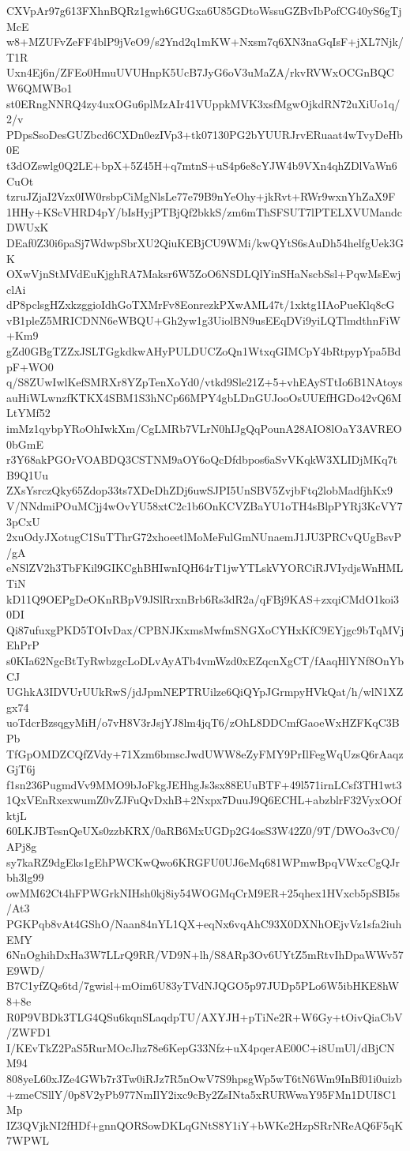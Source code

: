 CXVpAr97g613FXhnBQRz1gwh6GUGxa6U85GDtoWssuGZBvIbPofCG40yS6gTjMcE
w8+MZUFvZeFF4blP9jVeO9/s2Ynd2q1mKW+Nxsm7q6XN3naGqIsF+jXL7Njk/T1R
Uxn4Ej6n/ZFEo0HmuUVUHnpK5UcB7JyG6oV3uMaZA/rkvRVWxOCGnBQCW6QMWBo1
st0ERngNNRQ4zy4uxOGu6plMzAIr41VUppkMVK3xsfMgwOjkdRN72uXiUo1q/2/v
PDpsSsoDesGUZbcd6CXDn0ezIVp3+tk07130PG2bYUURJrvERuaat4wTvyDeHb0E
t3dOZswlg0Q2LE+bpX+5Z45H+q7mtnS+uS4p6e8cYJW4b9VXn4qhZDlVaWn6CuOt
tzruJZjaI2Vzx0IW0rsbpCiMgNlsLe77e79B9nYeOhy+jkRvt+RWr9wxnYhZaX9F
1HHy+KScVHRD4pY/bIsHyjPTBjQf2bkkS/zm6mThSFSUT7lPTELXVUMandcDWUxK
DEaf0Z30i6paSj7WdwpSbrXU2QiuKEBjCU9WMi/kwQYtS6sAuDh54helfgUek3GK
OXwVjnStMVdEuKjghRA7Maksr6W5ZoO6NSDLQlYinSHaNscbSsl+PqwMsEwjclAi
dP8pclsgHZxkzggioIdhGoTXMrFv8EonrezkPXwAML47t/1xktg1IAoPueKlq8cG
vB1pleZ5MRICDNN6eWBQU+Gh2yw1g3UiolBN9usEEqDVi9yiLQTlmdthnFiW+Km9
gZd0GBgTZZxJSLTGgkdkwAHyPULDUCZoQn1WtxqGIMCpY4bRtpypYpa5BdpF+WO0
q/S8ZUwIwlKefSMRXr8YZpTenXoYd0/vtkd9Sle21Z+5+vhEAySTtIo6B1NAtoys
auHiWLwnzfKTKX4SBM1S3hNCp66MPY4gbLDnGUJooOsUUEfHGDo42vQ6MLtYMf52
imMz1qybpYRoOhIwkXm/CgLMRb7VLrN0hIJgQqPounA28AIO8lOaY3AVREO0bGmE
r3Y68akPGOrVOABDQ3CSTNM9aOY6oQcDfdbpos6aSvVKqkW3XLIDjMKq7tB9Q1Uu
ZXsYsrczQky65Zdop33ts7XDeDhZDj6uwSJPI5UnSBV5ZvjbFtq2lobMadfjhKx9
V/NNdmiPOuMCjj4wOvYU58xtC2c1b6OnKCVZBaYU1oTH4sBlpPYRj3KcVY73pCxU
2xuOdyJXotugC1SuTThrG72xhoeetlMoMeFulGmNUnaemJ1JU3PRCvQUgBsvP/gA
eNSlZV2h3TbFKil9GIKCghBHIwnIQH64rT1jwYTLskVYORCiRJVIydjsWnHMLTiN
kD11Q9OEPgDeOKnRBpV9JSlRrxnBrb6Rs3dR2a/qFBj9KAS+zxqiCMdO1koi30DI
Qi87ufuxgPKD5TOIvDax/CPBNJKxmsMwfmSNGXoCYHxKfC9EYjgc9bTqMVjEhPrP
s0KIa62NgcBtTyRwbzgcLoDLvAyATb4vmWzd0xEZqcnXgCT/fAaqHlYNf8OnYbCJ
UGhkA3IDVUrUUkRwS/jdJpmNEPTRUilze6QiQYpJGrmpyHVkQat/h/wlN1XZgx74
uoTdcrBzsqgyMiH/o7vH8V3rJsjYJ8lm4jqT6/zOhL8DDCmfGaoeWxHZFKqC3BPb
TfGpOMDZCQfZVdy+71Xzm6bmscJwdUWW8eZyFMY9PrIlFegWqUzsQ6rAaqzGjT6j
f1sn236PugmdVv9MMO9bJoFkgJEHhgJs3sx88EUuBTF+49l571irnLCsf3TH1wt3
1QxVEnRxexwumZ0vZJFuQvDxhB+2Nxpx7DuuJ9Q6ECHL+abzblrF32VyxOOfktjL
60LKJBTesnQeUXs0zzbKRX/0aRB6MxUGDp2G4osS3W42Z0/9T/DWOo3vC0/APj8g
sy7kaRZ9dgEks1gEhPWCKwQwo6KRGFU0UJ6eMq681WPmwBpqVWxcCgQJrbh3lg99
owMM62Ct4hFPWGrkNIHsh0kj8iy54WOGMqCrM9ER+25qhex1HVxcb5pSBI5s/At3
PGKPqb8vAt4GShO/Naan84nYL1QX+eqNx6vqAhC93X0DXNhOEjvVz1sfa2iuhEMY
6NnOghihDxHa3W7LLrQ9RR/VD9N+lh/S8ARp3Ov6UYtZ5mRtvIhDpaWWv57E9WD/
B7C1yfZQs6td/7gwisl+mOim6U83yTVdNJQGO5p97JUDp5PLo6W5ibHKE8hW8+8e
R0P9VBDk3TLG4QSu6kqnSLaqdpTU/AXYJH+pTiNe2R+W6Gy+tOivQiaCbV/ZWFD1
I/KEvTkZ2PaS5RurMOcJhz78e6KepG33Nfz+uX4pqerAE00C+i8UmUl/dBjCNM94
808yeL60xJZe4GWb7r3Tw0iRJz7R5nOwV7S9hpsgWp5wT6tN6Wm9InBf01i0uizb
+zmeCSllY/0p8V2yPb977NmIlY2ixc9cBy2ZsINta5xRURWwaY95FMn1DUI8C1Mp
IZ3QVjkNI2fHDf+gnnQORSowDKLqGNtS8Y1iY+bWKe2HzpSRrNReAQ6F5qK7WPWL
